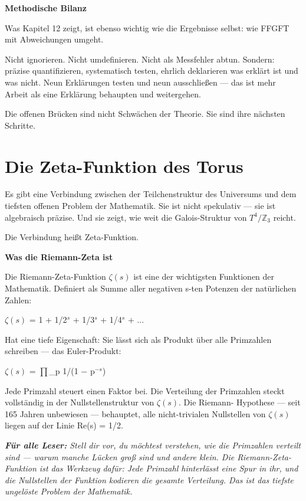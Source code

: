 \documentclass[11pt,oneside]{book}
\newenvironment{laierspur}{%
  \par\vspace{4pt}%
  \noindent\small\itshape\color{blue!60!black}%
  \textbf{Für alle Leser:}\enspace\ignorespaces}{%
  \par\vspace{4pt}\normalsize\normalfont\normalcolor}
\begin{document}
\textbf{Methodische Bilanz}


Was Kapitel 12 zeigt, ist ebenso wichtig wie die Ergebnisse selbst: wie
FFGFT mit Abweichungen umgeht.


Nicht ignorieren. Nicht umdefinieren. Nicht als Messfehler abtun.
Sondern: präzise quantifizieren, systematisch testen, ehrlich
deklarieren was erklärt ist und was nicht. Neun Erklärungen testen und
neun ausschließen — das ist mehr Arbeit als eine Erklärung behaupten
und weitergehen.


Die offenen Brücken sind nicht Schwächen der Theorie. Sie sind ihre
nächsten Schritte.








\chapter{Die Zeta-Funktion des Torus}

Es gibt eine Verbindung zwischen der Teilchenstruktur des Universums
und dem tiefsten offenen Problem der Mathematik. Sie ist nicht spekulativ —
sie ist algebraisch präzise. Und sie zeigt, wie weit die Galois-Struktur
von $T^4/\mathbb{Z}_3$ reicht.


Die Verbindung heißt Zeta-Funktion.


\textbf{Was die Riemann-Zeta ist}


Die Riemann-Zeta-Funktion $\zeta(s)$ ist eine der wichtigsten Funktionen der
Mathematik. Definiert als Summe aller negativen s-ten Potenzen der
natürlichen Zahlen:


$\zeta(s)$ = 1 + 1/2$^s$ + 1/3$^s$ + 1/4$^s$ + ...


Hat eine tiefe Eigenschaft: Sie lässt sich als Produkt über alle Primzahlen
schreiben — das Euler-Produkt:


$\zeta(s)$ = $\prod$\_p 1/(1 $-$ p$^{-s}$)


Jede Primzahl steuert einen Faktor bei. Die Verteilung der Primzahlen
steckt vollständig in der Nullstellenstruktur von $\zeta(s)$. Die Riemann-
Hypothese — seit 165 Jahren unbewiesen — behauptet, alle nicht-trivialen
Nullstellen von $\zeta(s)$ liegen auf der Linie Re(s) = 1/2.


\begin{laierspur}
Stell dir vor, du möchtest verstehen, wie die Primzahlen
verteilt sind — warum manche Lücken groß sind und andere klein.
Die Riemann-Zeta-Funktion ist das Werkzeug dafür: Jede Primzahl
hinterlässt eine Spur in ihr, und die Nullstellen der Funktion
kodieren die gesamte Verteilung. Das ist das tiefste ungelöste
Problem der Mathematik.
\end{laierspur}
\end{document}
